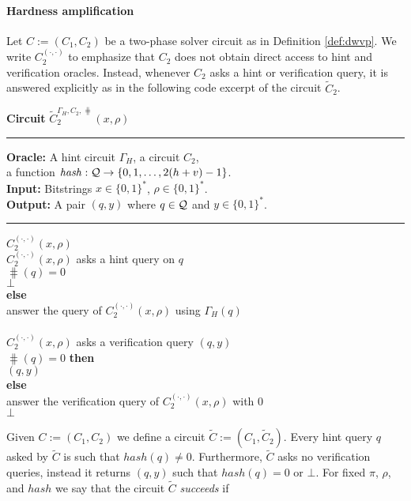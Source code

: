 \paragraph{Hardness amplification}%
Let $C := (C_1, C_2)$ be a two-phase solver circuit as in Definition \ref{def:dwvp}.
We write $C_2^{(\cdot, \cdot)}$ to emphasize that $C_2$ does not obtain direct access to hint and verification oracles.
Instead, whenever $C_2$ asks a hint or verification query, it is answered explicitly
as in the following code excerpt of the circuit $\widetilde{C}_2$.
\begin{codeblock}
  \textbf{Circuit} $\widetilde{C}_2^{\Gamma_H, C_2, \hash} (x, \rho)$
  \medskip \hrule
  \textbf{Oracle:} A hint circuit $\Gamma_H$, a circuit $C_2$, \\ \IndII a function $\operatorname{\mathit{hash}} : \mathcal{Q} \rightarrow \{0,1,\dots, 2(h+v)-1\}$. \\
  \textbf{Input:} Bitstrings $x \in \{0,1\}^{*}$, $\rho \in \{0,1\}^{*}$. \\
  \textbf{Output:} A pair $(q, y)$ where $q \in \mathcal{Q}$ and $y \in \{0,1\}^{*}$.
  \medskip\hrule
  \Run $C_2^{(\cdot, \cdot)}(x, \rho)$ \\
  \IndI \If $C_2^{(\cdot, \cdot)}(x, \rho)$ asks a hint query on $q$ \Then\\
  \IndII \If $\hash(q) = 0$ \Then\\
  \IndIII \Return $\bot$\\
  \IndII \textbf{else}\\
  \IndIII answer the query of $C_2^{(\cdot, \cdot)}(x, \rho)$ using $\Gamma_H(q)$\\
  \\
  \IndI \If $C_2^{(\cdot, \cdot)}(x, \rho)$ asks a verification query $(q, y)$ \Then \\
  \IndII \If $\hash(q) = 0 $ \textbf{then} \\
  \IndIII \Return $(q, y)$ \\
  \IndII \textbf{else} \\
  \IndIII answer the verification query of $C_2^{(\cdot, \cdot)}(x, \rho)$ with 0 \\
  \Return $\bot$
\end{codeblock}
%
Given $C := (C_1, C_2)$ we define a circuit $\widetilde{C} := (C_1, \widetilde{C}_2)$.
Every hint query $q$ asked by $\widetilde{C}$ is such that $hash(q) \neq 0$. Furthermore, $\widetilde{C}$ asks no verification queries,
instead it returns $(q,y)$ such that $hash(q) = 0$ or $\bot$.
For fixed $\pi$, $\rho$, and $hash$ we say that the circuit $\widetilde{C}$ \textit{succeeds} if
